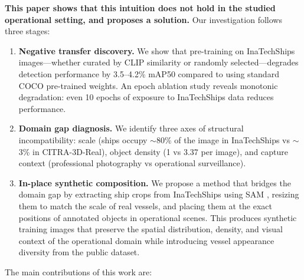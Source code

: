 \documentclass[a4paper,fleqn]{cas-dc}
\begin{document}
\textbf{This paper shows that this intuition does not hold in the studied operational setting, and proposes a solution.} Our investigation follows three stages:

\begin{enumerate}
    \item \textbf{Negative transfer discovery.} We show that pre-training on InaTechShips images---whether curated by CLIP similarity or randomly selected---degrades detection performance by 3.5--4.2\% mAP50 compared to using standard COCO pre-trained weights. An epoch ablation study reveals monotonic degradation: even 10 epochs of exposure to InaTechShips data reduces performance.
    
    \item \textbf{Domain gap diagnosis.} We identify three axes of structural incompatibility: scale (ships occupy $\sim$80\% of the image in InaTechShips vs $\sim$3\% in CITRA-3D-Real), object density (1 vs 3.37 per image), and capture context (professional photography vs operational surveillance).
    
    \item \textbf{In-place synthetic composition.} We propose a method that bridges the domain gap by extracting ship crops from InaTechShips using SAM \citep{kirillov2023segment}, resizing them to match the scale of real vessels, and placing them at the exact positions of annotated objects in operational scenes. This produces synthetic training images that preserve the spatial distribution, density, and visual context of the operational domain while introducing vessel appearance diversity from the public dataset.
\end{enumerate}

The main contributions of this work are:
\end{document}
